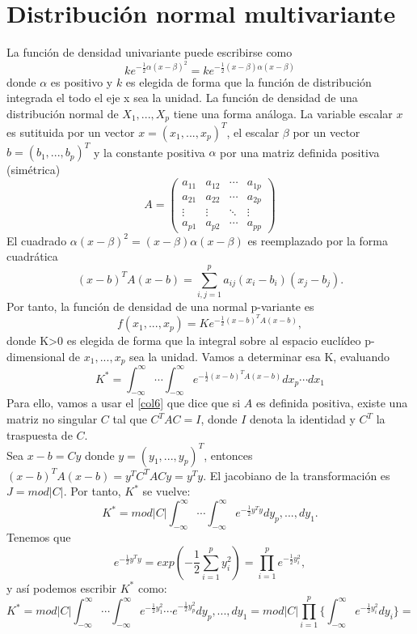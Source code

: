\section{Distribución normal multivariante}
La función de densidad univariante puede escribirse como
\[ ke^{-\frac{1}{2}\alpha(x-\beta)^{2}}=ke^{-\frac{1}{2}(x-\beta)\alpha(x-\beta)} \]
donde $\alpha$ es positivo y $k$ es elegida de forma que la función de distribución integrada el todo el eje x sea la unidad. La función de densidad de una distribución normal de $X_{1},...,X_{p}$ tiene una forma análoga. La variable escalar $x$ es sutituida por un vector $x=(x_{1},...,x_{p})^{T}$, el escalar $\beta$ por un vector $b=(b_{1},...,b_p)^T$ y la constante positiva $\alpha$ por una matriz definida positiva (simétrica)
\begin{equation}
A=\begin{pmatrix}
a_{11} & a_{12} & \cdots & a_{1p}\\
a_{21} & a_{22} & \cdots & a_{2p}\\
\vdots & \vdots & \ddots & \vdots\\
a_{p1} & a_{p2} & \cdots & a_{pp}
\end{pmatrix}
\end{equation} 
El cuadrado $\alpha(x-\beta)^2=(x-\beta)\alpha(x-\beta)$ es reemplazado por la forma cuadrática
\[ (x-b)^T A (x-b) = \sum_{i,j=1}^{p}a_{ij}(x_i-b_i)(x_j-b_j). \]
Por tanto, la función de densidad de una normal p-variante es
\[ f(x_1,...,x_p)=Ke^{-\frac{1}{2}(x-b)^T A (x-b)} ,\]
donde K>0 es elegida de forma que la integral sobre al espacio euclídeo p-dimensional de $x_1,...,x_p$ sea la unidad. Vamos a determinar esa K, evaluando
\[ K^* = \int_{-\infty}^{\infty} \dotsb \int_{-\infty}^{\infty} e^{-\frac{1}{2}(x-b)^T A (x-b)} dx_p \dotsb dx_1 \]
Para ello, vamos a usar el \autoref{col6} que dice que si $A$ es definida positiva, existe una matriz no singular $C$ tal que $C^TAC=I$, donde $I$ denota la identidad y $C^T$ la traspuesta de $C$.\\
Sea $x-b=Cy$ donde $y=(y_1,...,y_p)^T$, entonces $(x-b)^TA(x-b)=y^TC^TACy=y^Ty$. El jacobiano de la transformación es $J=mod \vert C \vert$. Por tanto, $K^*$ se vuelve:
\[ K^*=mod \vert C \vert \int_{-\infty}^{\infty} \dotsb \int_{-\infty}^{\infty} e^{-\frac{1}{2}y^Ty} dy_p,...,dy_1. \]
Tenemos que
\[ e^{-\frac{1}{2}y^Ty}=exp \left( -\frac{1}{2} \sum_{i=1}^p y_i^2 \right) = \prod_{i=1}^p e^{-\frac{1}{2}y_i^2},\]
y así podemos escribir $K^*$ como:
\[ K^*=mod \vert C \vert \int_{-\infty}^{\infty} \dotsb \int_{-\infty}^{\infty} e^{-\frac{1}{2}y_1^2} \dotsb e^{-\frac{1}{2}y_p^2} dy_p,...,dy_1 = mod \vert C \vert \prod_{i=1}^p \lbrace \int_{-\infty}^{\infty} e^{-\frac{1}{2}y_i^2} dy_i \rbrace= \]
